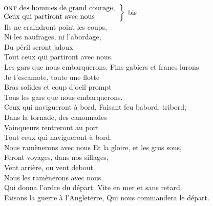 \vspace{-0.3cm}
\\ 
$\left.\begin{tabular}{l}
\hspace{-0.4cm}
\textsc{ont} des hommes de grand courage,
\\
\hspace{-0.4cm}
Ceux qui partiront avec nous
\end{tabular}\right\rbrace$ bis
\\Ils ne craindront point les coups,
\\Ni les naufrages, ni l'abordage,
\\Du péril seront jaloux
\\Tout ceux qui partiront avec nous. \bissimple
\\
{Les gars que nous embarquerons.}
Fins gabiers et francs lurons
\\Je t'escamote, toute une flotte
\\Bras solides et coup d'oeil prompt
\\Tous les gars que nous embarquerons. \bissimple
\\
{Ceux qui navigueront à bord,}
Faisant feu babord, tribord,
\\Dans la tornade, des canonnades
\\Vainqueurs rentreront au port
\\Tout ceux qui navigueront à bord. \bissimple
\\
{Nous ramènerons avec nous}
Et la gloire, et les gros sous,
\\Feront voyages, dans nos sillages,
\\Vent arrière, ou vent debout
\\Nous les ramènerons avec nous. \bissimple
\\
{Qui donna l'ordre du départ.}
Vite en mer et sans retard.
\\Faisons la guerre à l'Angleterre,
{Qui nous commandera le départ.}

\breakpage
